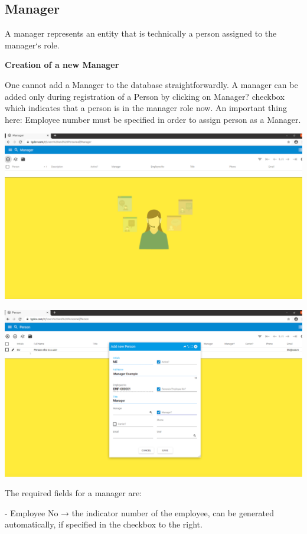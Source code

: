 \subsection{Manager}
A manager represents an entity that is technically a person assigned to the manager`s role.

\textbf{Creation of a new Manager}

One cannot add a Manager to the database straightforwardly. 
A manager can be added only during registration of a Person by clicking on Manager? checkbox which indicates that a person is in the manager role now.
An important thing here: Employee number must be specified in order to assign person as a Manager.

\includegraphics[width=\textwidth]{sections/01-chapter/images/manager1.png}

\includegraphics[width=\textwidth]{sections/01-chapter/images/manager2.png}


The required fields for a manager are:

- Employee No → the indicator number of the employee, can be generated automatically, if specified in the checkbox to the right.

